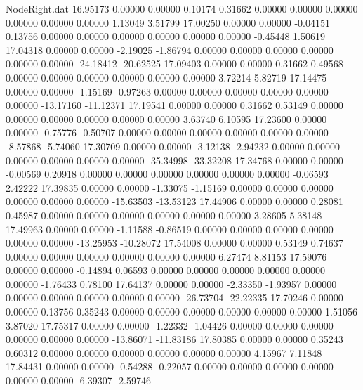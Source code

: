 \begin{filecontents}{NodeRight.dat}
  16.95173    0.00000    0.00000     0.10174    0.31662    0.00000    0.00000    0.00000    0.00000    0.00000    0.00000    1.13049    3.51799
  17.00250    0.00000    0.00000    -0.04151    0.13756    0.00000    0.00000    0.00000    0.00000    0.00000    0.00000   -0.45448    1.50619
  17.04318    0.00000    0.00000    -2.19025   -1.86794    0.00000    0.00000    0.00000    0.00000    0.00000    0.00000  -24.18412  -20.62525
  17.09403    0.00000    0.00000     0.31662    0.49568    0.00000    0.00000    0.00000    0.00000    0.00000    0.00000    3.72214    5.82719
  17.14475    0.00000    0.00000    -1.15169   -0.97263    0.00000    0.00000    0.00000    0.00000    0.00000    0.00000  -13.17160  -11.12371
  17.19541    0.00000    0.00000     0.31662    0.53149    0.00000    0.00000    0.00000    0.00000    0.00000    0.00000    3.63740    6.10595
  17.23600    0.00000    0.00000    -0.75776   -0.50707    0.00000    0.00000    0.00000    0.00000    0.00000    0.00000   -8.57868   -5.74060
  17.30709    0.00000    0.00000    -3.12138   -2.94232    0.00000    0.00000    0.00000    0.00000    0.00000    0.00000  -35.34998  -33.32208
  17.34768    0.00000    0.00000    -0.00569    0.20918    0.00000    0.00000    0.00000    0.00000    0.00000    0.00000   -0.06593    2.42222
  17.39835    0.00000    0.00000    -1.33075   -1.15169    0.00000    0.00000    0.00000    0.00000    0.00000    0.00000  -15.63503  -13.53123
  17.44906    0.00000    0.00000     0.28081    0.45987    0.00000    0.00000    0.00000    0.00000    0.00000    0.00000    3.28605    5.38148
  17.49963    0.00000    0.00000    -1.11588   -0.86519    0.00000    0.00000    0.00000    0.00000    0.00000    0.00000  -13.25953  -10.28072
  17.54008    0.00000    0.00000     0.53149    0.74637    0.00000    0.00000    0.00000    0.00000    0.00000    0.00000    6.27474    8.81153
  17.59076    0.00000    0.00000    -0.14894    0.06593    0.00000    0.00000    0.00000    0.00000    0.00000    0.00000   -1.76433    0.78100
  17.64137    0.00000    0.00000    -2.33350   -1.93957    0.00000    0.00000    0.00000    0.00000    0.00000    0.00000  -26.73704  -22.22335
  17.70246    0.00000    0.00000     0.13756    0.35243    0.00000    0.00000    0.00000    0.00000    0.00000    0.00000    1.51056    3.87020
  17.75317    0.00000    0.00000    -1.22332   -1.04426    0.00000    0.00000    0.00000    0.00000    0.00000    0.00000  -13.86071  -11.83186
  17.80385    0.00000    0.00000     0.35243    0.60312    0.00000    0.00000    0.00000    0.00000    0.00000    0.00000    4.15967    7.11848
  17.84431    0.00000    0.00000    -0.54288   -0.22057    0.00000    0.00000    0.00000    0.00000    0.00000    0.00000   -6.39307   -2.59746

\end{filecontents}
